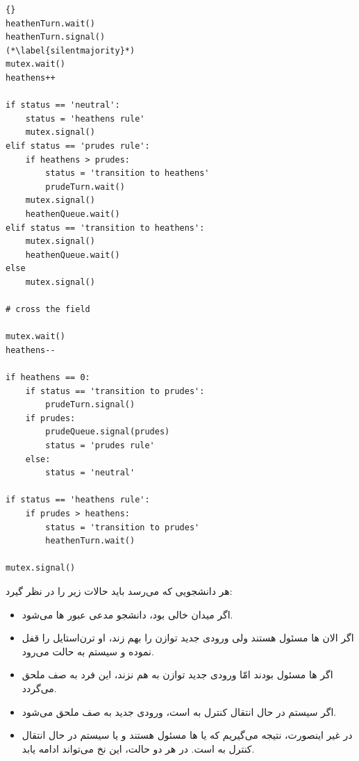 \documentclass{book}
\begin{document}
\begin{latin}
\begin{lstlisting}[title=\rl{راه‌حل مسأله  \lr{Modus} }]{}
heathenTurn.wait()
heathenTurn.signal()
(*\label{silentmajority}*)
mutex.wait()
heathens++

if status == 'neutral':
    status = 'heathens rule'
    mutex.signal()
elif status == 'prudes rule':
    if heathens > prudes:
        status = 'transition to heathens'
        prudeTurn.wait()
    mutex.signal()
    heathenQueue.wait()
elif status == 'transition to heathens':
    mutex.signal()
    heathenQueue.wait()
else
    mutex.signal()

# cross the field

mutex.wait()
heathens--

if heathens == 0:
    if status == 'transition to prudes':
        prudeTurn.signal()
    if prudes:
        prudeQueue.signal(prudes)
        status = 'prudes rule'
    else:
        status = 'neutral'
        
if status == 'heathens rule':
    if prudes > heathens:
        status = 'transition to prudes'
        heathenTurn.wait()

mutex.signal()
\end{lstlisting}
\end{latin}

    هر دانشجویی که می‌رسد باید حالات زیر را در نظر گیرد: 

\begin{itemize}

\item
    اگر میدان خالی بود، دانشجو مدعی عبور ها می‌شود. 

\item
    اگر  الان ها مسئول هستند ولی ورودی جدید توازن را بهم زند، او ترن‌استایل  را قفل نموده و سیستم 
    به حالت  می‌رود. 

\item
    اگر ها مسئول بودند امّا ورودی جدید توازن به هم نزند، این فرد به صف ملحق می‌گردد. 

\item
    اگر سیستم در حال انتقال کنترل به   است، ورودی جدید به صف ملحق می‌شود. 

\item
    در غیر اینصورت،  نتیجه می‌گیریم که یا  ها مسئول هستند و یا سیستم در حال انتقال کنترل به   است. 
    در هر دو حالت، این نخ می‌تواند ادامه یابد. 
\end{itemize}  
\end{document}
